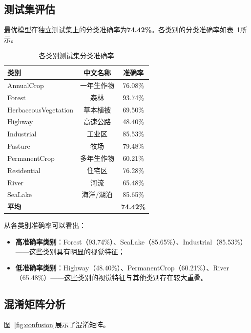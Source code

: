 \documentclass[12pt,a4paper]{article}
\begin{document}
\subsection{测试集评估}

最优模型在独立测试集上的分类准确率为\textbf{74.42\%}。各类别的分类准确率如表~\ref{tab:per_class}所示。

\begin{table}[H]
\centering
\caption{各类别测试集分类准确率}
\label{tab:per_class}
\begin{tabular}{lcc}
\toprule
\textbf{类别} & \textbf{中文名称} & \textbf{准确率} \\
\midrule
AnnualCrop & 一年生作物 & 76.08\% \\
Forest & 森林 & 93.74\% \\
HerbaceousVegetation & 草本植被 & 69.50\% \\
Highway & 高速公路 & 48.40\% \\
Industrial & 工业区 & 85.53\% \\
Pasture & 牧场 & 79.48\% \\
PermanentCrop & 多年生作物 & 60.21\% \\
Residential & 住宅区 & 76.28\% \\
River & 河流 & 65.48\% \\
SeaLake & 海洋/湖泊 & 85.65\% \\
\midrule
\textbf{平均} & & \textbf{74.42\%} \\
\bottomrule
\end{tabular}
\end{table}

从各类别准确率可以看出：

\begin{itemize}[leftmargin=2em]
    \item \textbf{高准确率类别}：Forest（93.74\%）、SeaLake（85.65\%）、Industrial（85.53\%）——这些类别具有明显的视觉特征；
    \item \textbf{低准确率类别}：Highway（48.40\%）、PermanentCrop（60.21\%）、River（65.48\%）——这些类别的视觉特征与其他类别存在较大重叠。
\end{itemize}

\subsection{混淆矩阵分析}

图~\ref{fig:confusion}展示了混淆矩阵。
\end{document}
